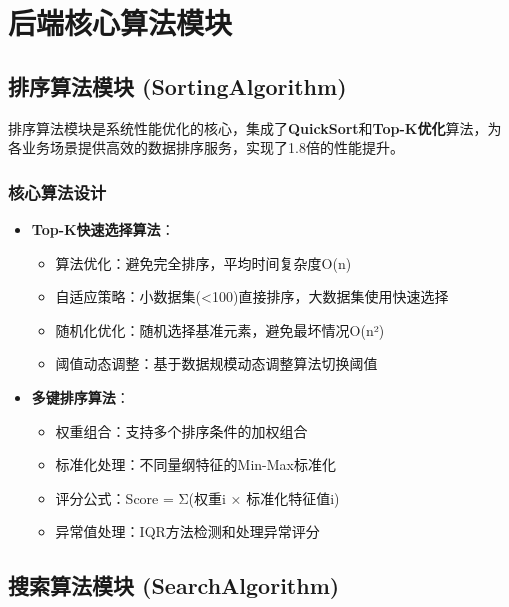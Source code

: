 \documentclass[12pt,a4paper]{article}
\begin{document}
\section{后端核心算法模块}

\subsection{排序算法模块 (SortingAlgorithm)}

\begin{designbox}[title={高性能排序引擎}]
排序算法模块是系统性能优化的核心，集成了\textbf{QuickSort}和\textbf{Top-K优化}算法，为各业务场景提供高效的数据排序服务，实现了1.8倍的性能提升。
\end{designbox}

\subsubsection{核心算法设计}

\begin{itemize}
    \item \textbf{Top-K快速选择算法}：
    \begin{itemize}
        \item 算法优化：避免完全排序，平均时间复杂度O(n)
        \item 自适应策略：小数据集(<100)直接排序，大数据集使用快速选择
        \item 随机化优化：随机选择基准元素，避免最坏情况O(n²)
        \item 阈值动态调整：基于数据规模动态调整算法切换阈值
    \end{itemize}
    
    \item \textbf{多键排序算法}：
    \begin{itemize}
        \item 权重组合：支持多个排序条件的加权组合
        \item 标准化处理：不同量纲特征的Min-Max标准化
        \item 评分公式：Score = Σ(权重i × 标准化特征值i)
        \item 异常值处理：IQR方法检测和处理异常评分
    \end{itemize}
\end{itemize}

\subsection{搜索算法模块 (SearchAlgorithm)}
\end{document}
